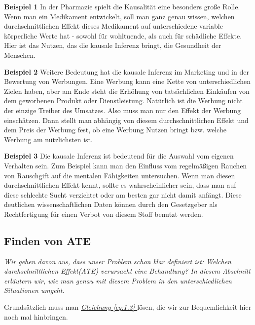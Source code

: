 \documentclass[12pt,a4paper,twoside]{scrartcl}
\numberwithin{equation}{section}
\renewcommand*{\refeq}[1]{\emph{\hyperref[#1]{Gleichung \ref*{#1} }}}
\begin{document}
\noindent
\textbf{Beispiel 1}\label{motivationBeispiel1} In der Pharmazie spielt die Kausalität eine besonders große Rolle. Wenn man ein Medikament entwickelt, soll man ganz genau wissen, welchen durchschnittlichen Effekt dieses Medikament auf unterschiedene variable körperliche Werte hat - sowohl für wohltuende, als auch für schädliche Effekte. Hier ist das Nutzen, das die kausale Inferenz bringt, die Gesundheit der Menschen.\par

\noindent
\textbf{Beispiel 2}\label{motivationBeispiel2} Weitere Bedeutung hat die kausale Inferenz im Marketing und in der Bewertung von Werbungen. Eine Werbung kann eine Kette von unterschiedlichen Zielen haben, aber am Ende steht die Erhöhung von tatsächlichen Einkäufen von dem geworbenen Produkt oder Dienstleistung. Natürlich ist die Werbung nicht der einzige Treiber des Umsatzes. Also muss man nur den Effekt der Werbung einschätzen. Dann stellt man abhängig von diesem durchschnittlichen Effekt und dem Preis der Werbung fest, ob eine Werbung Nutzen bringt bzw. welche Werbung am nützlichsten ist.\par

\noindent
\textbf{Beispiel 3}\label{motivationBeispiel3} Die kausale Inferenz ist bedeutend für die Auswahl vom eigenen Verhalten sein. Zum Beispiel kann man den Einfluss vom regelmäßigen Rauchen von Rauschgift auf die mentalen Fähigkeiten untersuchen. Wenn man diesen durchschnittlichen Effekt kennt, sollte es wahrscheinlicher sein, dass man auf diese schlechte Sucht verzichtet oder am besten gar nicht damit anfängt. Diese deutlichen wissenschaftlichen Daten können durch den Gesetzgeber als Rechtfertigung für einen Verbot von diesem Stoff benutzt werden.\par
\subsection{Finden von ATE}\label{subsec:findenATE}
\noindent
\textit{Wir gehen davon aus, dass unser Problem schon klar definiert ist: Welchen durchschnittlichen Effekt(ATE) verursacht eine Behandlung? In diesem Abschnitt erläutern wir, wie man genau mit diesem Problem in den unterschiedlichen Situationen umgeht.}\par

\vspace{7mm}

Grundsätzlich muss man \refeq{eq:1.3} lösen, die wir zur Bequemlichkeit hier noch mal hinbringen.\par 
\end{document}
